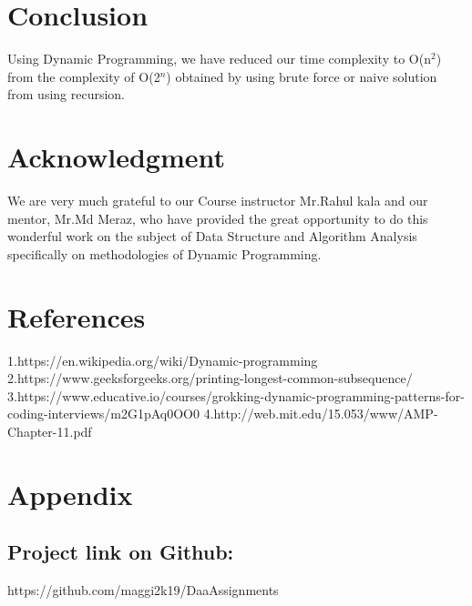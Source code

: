 \documentclass[conference]{IEEEtran}
\begin{document}

\section{Conclusion}
Using Dynamic Programming, we have reduced our time complexity to O(n$^{2}$) from the complexity of O(2$^{n}$) obtained by using brute force or naive solution from using recursion.

\section{Acknowledgment}
We are very much grateful to our Course instructor Mr.Rahul kala and our mentor, Mr.Md Meraz, who have provided the great opportunity to do this wonderful work on the subject of Data Structure and Algorithm Analysis specifically on methodologies of Dynamic Programming.

\section{References}

\begin{enumerate}
1.https://en.wikipedia.org/wiki/Dynamic-programming\newline
2.https://www.geeksforgeeks.org/printing-longest-common-subsequence/\newline
3.https://www.educative.io/courses/grokking-dynamic-programming-patterns-for-coding-interviews/m2G1pAq0OO0\newline
4.http://web.mit.edu/15.053/www/AMP-Chapter-11.pdf\newline
\end{enumerate}

\section{Appendix}

\subsection{Project link on Github:}
https://github.com/maggi2k19/DaaAssignments
\end{document}
